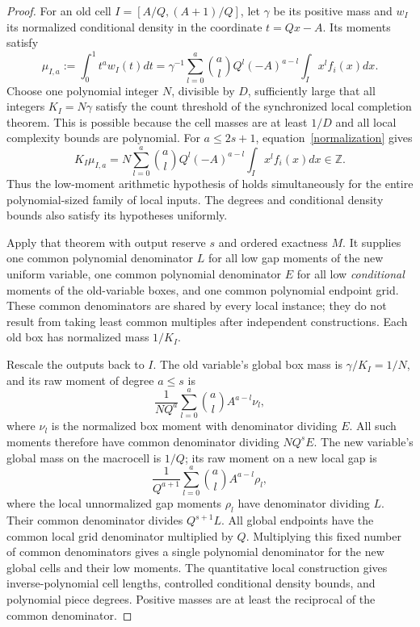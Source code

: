 \documentclass[11pt]{article}
\begin{document}
\begin{proof}
For an old cell $I=[A/Q,(A+1)/Q]$, let $\gamma$ be its positive mass
and $w_I$ its normalized conditional density in the coordinate
$t=Qx-A$. Its moments satisfy
\begin{equation}\label{normalization}
 \mu_{I,a}:=\int_0^1t^aw_I(t)dt
 =\gamma^{-1}\sum_{l=0}^a\binom al Q^l(-A)^{a-l}
                              \int_I x^lf_i(x)dx.
\end{equation}
Choose one polynomial integer $N$, divisible by $D$, sufficiently large
that all integers $K_I=N\gamma$ satisfy the count threshold of the
synchronized local completion theorem. This is possible because the
cell masses are at least $1/D$ and all local complexity bounds are
polynomial. For $a\le2s+1$, equation~\eqref{normalization} gives
\begin{equation}\label{integer}
 K_I\mu_{I,a}
 =N\sum_{l=0}^a\binom al Q^l(-A)^{a-l}\int_I x^lf_i(x)dx
 \in\mathbb Z.
\end{equation}
Thus the low-moment arithmetic hypothesis of
holds simultaneously for the entire polynomial-sized family of local
inputs. The degrees and conditional density bounds also satisfy its
hypotheses uniformly.

Apply that theorem with output reserve $s$ and ordered exactness $M$.
It supplies one common polynomial denominator $L$ for all low gap
moments of the new uniform variable, one common polynomial denominator
$E$ for all low \emph{conditional} moments of the old-variable boxes,
and one common polynomial endpoint grid. These common denominators
are shared by every local instance; they do not result from taking
least common multiples after independent constructions. Each old box
has normalized mass $1/K_I$.

Rescale the outputs back to $I$. The old variable's global box mass
is $\gamma/K_I=1/N$, and its raw moment of degree $a\le s$ is
\[
 \frac1{NQ^a}\sum_{l=0}^a\binom al A^{a-l}\nu_l,
\]
where $\nu_l$ is the normalized box moment with denominator dividing
$E$. All such moments therefore have common denominator dividing
$NQ^sE$. The new variable's global mass on the macrocell is $1/Q$;
its raw moment on a new local gap is
\[
 \frac1{Q^{a+1}}\sum_{l=0}^a\binom al A^{a-l}\rho_l,
\]
where the local unnormalized gap moments $\rho_l$ have denominator
dividing $L$. Their common denominator divides $Q^{s+1}L$.
All global endpoints have the common local grid denominator multiplied
by $Q$. Multiplying this fixed number of common denominators gives a
single polynomial denominator for the new global cells and their low
moments. The quantitative local construction gives inverse-polynomial
cell lengths, controlled conditional density bounds, and polynomial
piece degrees. Positive masses are at least the reciprocal of the
common denominator.


\end{proof}
\end{document}
